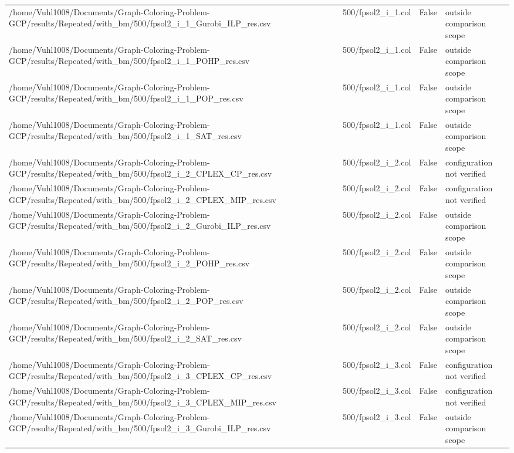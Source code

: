 \begin{table}[htbp]
\begin{tabular}{llll}
/home/Vuhl1008/Documents/Graph-Coloring-Problem-GCP/results/Repeated/with\_bm/500/fpsol2\_i\_1\_Gurobi\_ILP\_res.csv & 500/fpsol2\_i\_1.col & False & outside comparison scope \\
/home/Vuhl1008/Documents/Graph-Coloring-Problem-GCP/results/Repeated/with\_bm/500/fpsol2\_i\_1\_POHP\_res.csv & 500/fpsol2\_i\_1.col & False & outside comparison scope \\
/home/Vuhl1008/Documents/Graph-Coloring-Problem-GCP/results/Repeated/with\_bm/500/fpsol2\_i\_1\_POP\_res.csv & 500/fpsol2\_i\_1.col & False & outside comparison scope \\
/home/Vuhl1008/Documents/Graph-Coloring-Problem-GCP/results/Repeated/with\_bm/500/fpsol2\_i\_1\_SAT\_res.csv & 500/fpsol2\_i\_1.col & False & outside comparison scope \\
/home/Vuhl1008/Documents/Graph-Coloring-Problem-GCP/results/Repeated/with\_bm/500/fpsol2\_i\_2\_CPLEX\_CP\_res.csv & 500/fpsol2\_i\_2.col & False & configuration not verified \\
/home/Vuhl1008/Documents/Graph-Coloring-Problem-GCP/results/Repeated/with\_bm/500/fpsol2\_i\_2\_CPLEX\_MIP\_res.csv & 500/fpsol2\_i\_2.col & False & configuration not verified \\
/home/Vuhl1008/Documents/Graph-Coloring-Problem-GCP/results/Repeated/with\_bm/500/fpsol2\_i\_2\_Gurobi\_ILP\_res.csv & 500/fpsol2\_i\_2.col & False & outside comparison scope \\
/home/Vuhl1008/Documents/Graph-Coloring-Problem-GCP/results/Repeated/with\_bm/500/fpsol2\_i\_2\_POHP\_res.csv & 500/fpsol2\_i\_2.col & False & outside comparison scope \\
/home/Vuhl1008/Documents/Graph-Coloring-Problem-GCP/results/Repeated/with\_bm/500/fpsol2\_i\_2\_POP\_res.csv & 500/fpsol2\_i\_2.col & False & outside comparison scope \\
/home/Vuhl1008/Documents/Graph-Coloring-Problem-GCP/results/Repeated/with\_bm/500/fpsol2\_i\_2\_SAT\_res.csv & 500/fpsol2\_i\_2.col & False & outside comparison scope \\
/home/Vuhl1008/Documents/Graph-Coloring-Problem-GCP/results/Repeated/with\_bm/500/fpsol2\_i\_3\_CPLEX\_CP\_res.csv & 500/fpsol2\_i\_3.col & False & configuration not verified \\
/home/Vuhl1008/Documents/Graph-Coloring-Problem-GCP/results/Repeated/with\_bm/500/fpsol2\_i\_3\_CPLEX\_MIP\_res.csv & 500/fpsol2\_i\_3.col & False & configuration not verified \\
/home/Vuhl1008/Documents/Graph-Coloring-Problem-GCP/results/Repeated/with\_bm/500/fpsol2\_i\_3\_Gurobi\_ILP\_res.csv & 500/fpsol2\_i\_3.col & False & outside comparison scope \\

\end{tabular}
\end{table}
